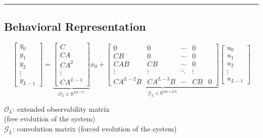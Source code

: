 \hrule

\subsection{Behavioral Representation}
\begin{minipage}{0.68\textwidth}
    \[
        \begin{bmatrix}
        y_0 \\
        y_1 \\
        y_2 \\
        \vdots \\
        y_{L-1}
        \end{bmatrix}
        =
        \underbrace{
        \begin{bmatrix}
        C \\
        CA \\
        CA^2 \\
        \vdots \\
        CA^{L-1}
        \end{bmatrix}
        }_{\mathcal{O}_L \in \mathbb{R}^{Lp \times n}}
        x_0
        +
        \underbrace{
        \begin{bmatrix}
        0 & 0 & \cdots & 0 \\
        CB & 0 & \cdots & 0 \\
        CAB & CB & \cdots & 0 \\
        \vdots & \vdots & \ddots & \vdots \\
        CA^{L-2}B & CA^{L-3}B & \cdots & CB & 0
        \end{bmatrix}
        }_{\mathcal{G}_L \in \mathbb{R}^{Lp \times Lm}}
        \begin{bmatrix}
        u_0 \\
        u_1 \\
        u_2 \\
        \vdots \\
        u_{L-1}
        \end{bmatrix}
    \]
\end{minipage}
\begin{minipage}{0.28\textwidth}
    $\mathcal{O}_L$: extended observability matrix \\
    (free evolution of the system) \\
    $\mathcal{G}_L$: convolution matrix
    (forced evolution of the system)
\end{minipage}\\ \\
